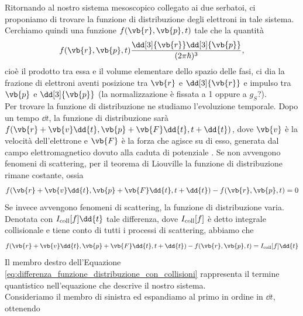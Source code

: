 Ritornando al nostro sistema mesoscopico collegato ai due serbatoi, ci proponiamo di trovare la funzione di distribuzione degli elettroni in tale sistema.\\
Cerchiamo quindi una funzione $f(\vb{r},\vb{p},t)$ tale che la quantità
\begin{equation*}
    f(\vb{r},\vb{p},t) \frac{\dd[3]{\vb{r}} \dd[3]{\vb{p}}}{(2 \pi \hbar)^3},
\end{equation*}
cioè il prodotto tra essa e il volume elementare dello spazio delle fasi, ci dia la frazione di elettroni aventi posizione tra $\vb{r}$ e $\dd[3]{\vb{r}}$ e impulso tra $\vb{p}$ e $\dd[3]{\vb{p}}$ (la normalizzazione è fissata a 1 oppure a $g_S$?).\\
Per trovare la funzione di distribuzione ne studiamo l'evoluzione temporale. Dopo un tempo $\dd{t}$, la funzione di distribuzione sarà $f(\vb{r} + \vb{v} \dd{t}, \vb{p} + \vb{F} \dd{t}, t + \dd{t})$, dove $\vb{v}$ è la velocità dell'elettrone e $\vb{F}$ è la forza che agisce su di esso, generata dal campo elettromagnetico dovuto alla caduta di potenziale
. Se non avvengono fenomeni di scattering, per il teorema di Liouville la funzione di distribuzione rimane costante, ossia
\begin{equation*}
    f(\vb{r} + \vb{v} \dd{t}, \vb{p} + \vb{F} \dd{t}, t + \dd{t}) - f(\vb{r}, \vb{p}, t)
    =0
\end{equation*}
Se invece avvengono fenomeni di scattering, la funzione di distribuzione varia. Denotata con $I_{\rm coll}[f] \dd{t}$ tale differenza, dove $I_{\rm coll}[f]$ è detto integrale collisionale e tiene conto di tutti i processi di scattering, abbiamo che
\begin{equation}
    f(\vb{r} + \vb{v} \dd{t}, \vb{p} + \vb{F} \dd{t}, t + \dd{t}) - f(\vb{r}, \vb{p}, t)
    =I_{\rm coll}[f] \dd{t}
    \label{eq:differenza_funzione_distribuzione_con_collisioni}
\end{equation}
Il membro destro dell'Equazione \eqref{eq:differenza_funzione_distribuzione_con_collisioni} rappresenta il termine quantistico nell'equazione che descrive il nostro sistema.\\
Consideriamo il membro di sinistra ed espandiamo al primo in ordine in $\dd{t}$, ottenendo
